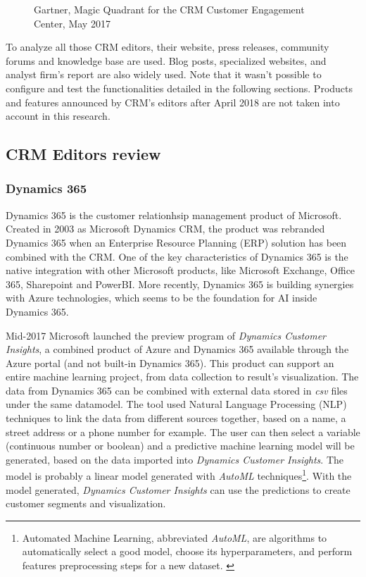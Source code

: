 \begin{figure}[!h]
\begin{minipage}[c]{0.49\linewidth}
        \caption[Magic Quadrant for the CRM Customer Engagement Center]{Gartner, Magic Quadrant for the CRM Customer Engagement Center, May 2017}
        \label{fig:magic-quadrant-customer-engagement}
    \end{minipage}
\end{figure}

To analyze all those CRM editors, their website, press releases, community forums and knowledge base are used. Blog posts, specialized websites, and analyst firm's report are also widely used. Note that it wasn't possible to configure and test the functionalities detailed in the following sections. Products and features announced by CRM's editors after April 2018 are not taken into account in this research.

\subsection{CRM Editors review}

\subsubsection*{Dynamics 365}
Dynamics 365 is the customer relationhsip management product of Microsoft. Created in 2003 as Microsoft Dynamics CRM, the product was rebranded Dynamics 365 when an Enterprise Resource Planning (ERP) solution has been combined with the CRM. One of the key characteristics of Dynamics 365 is the native integration with other Microsoft products, like Microsoft Exchange, Office 365, Sharepoint and PowerBI. More recently, Dynamics 365 is building synergies with Azure technologies, which seems to be the foundation for AI inside Dynamics 365. 

Mid-2017 Microsoft launched the preview program of \textit{Dynamics Customer Insights}, a combined product of Azure and Dynamics 365 available through the Azure portal (and not built-in Dynamics 365). This product can support an entire machine learning project, from data collection to result's visualization. The data from Dynamics 365 can be combined with external data stored in \textit{csv} files under the same datamodel. The tool used Natural Language Processing (NLP) techniques to link the data from different sources together, based on a name, a street address or a phone number for example. The user can then select a variable (continuous number or boolean) and a predictive machine learning model will be generated, based on the data imported into \textit{Dynamics Customer Insights}. The model is probably a linear model generated with \textit{AutoML} techniques\footnote{Automated Machine Learning, abbreviated \textit{AutoML}, are algorithms to automatically select a good model, choose its hyperparameters, and perform features preprocessing steps for a new dataset. \cite{NIPS2015_5872}}. With the model generated, \textit{Dynamics Customer Insights} can use the predictions to create customer segments and visualization.

